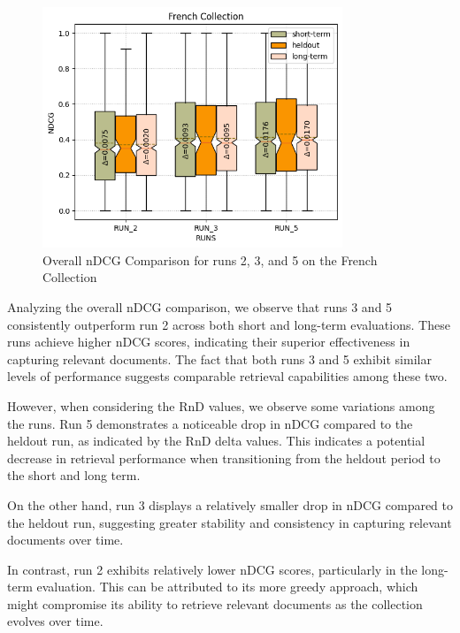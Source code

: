 \begin{figure}[!h]
\centering
\includegraphics[width=0.8\textwidth]{figure/StatisticalAnalysis/BoxPlot/NDGC French.png}
\caption{Overall \ac{nDCG} Comparison for runs 2, 3, and 5 on the French Collection}
\label{fig:overall_ndcg_french_boxplot}
\end{figure}

Analyzing the overall \ac{nDCG} comparison, we observe that runs 3 and 5 consistently outperform run 2 across both short and long-term evaluations. 
These runs achieve higher \ac{nDCG} scores, indicating their superior effectiveness in capturing relevant documents. 
The fact that both runs 3 and 5 exhibit similar levels of performance suggests comparable retrieval capabilities among these two.

However, when considering the \ac{RnD} values, we observe some variations among the runs. 
Run 5 demonstrates a noticeable drop in \ac{nDCG} compared to the heldout run, as indicated by the \ac{RnD} delta values. 
This indicates a potential decrease in retrieval performance when transitioning from the heldout period to the short and long term.

On the other hand, run 3 displays a relatively smaller drop in \ac{nDCG} compared to the heldout run, suggesting greater stability and consistency in capturing relevant documents over time.

In contrast, run 2 exhibits relatively lower \ac{nDCG} scores, particularly in the long-term evaluation. This can be attributed to its more greedy approach, which might compromise its ability to retrieve relevant documents as the collection evolves over time.


\newpage
\enlargethispage{5\baselineskip}
